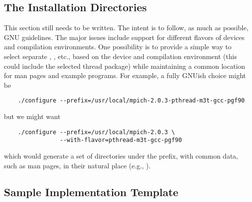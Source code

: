 \documentclass{article}
\begin{document}
\subsection{The Installation Directories}
\label{sec:install-dirs}
This section still needs to be written.  The intent is to follow, as
much as possible, GNU guidelines.  The major issues include support
for different flavors of devices and compilation environments.  One
possibility is to provide a simple way to select separate
, , etc., based on the device and
compilation environment (this could include the selected thread
package) while maintaining a common location for man pages and example
programs.  For example, a fully GNUish choice might be
\begin{verbatim}
    ./configure --prefix=/usr/local/mpich-2.0.3-pthread-m3t-gcc-pgf90
\end{verbatim}
but we might want
\begin{verbatim}
    ./configure --prefix=/usr/local/mpich-2.0.3 \
                --with-flavor=pthread-m3t-gcc-pgf90
\end{verbatim}
which would generate a set of directories under the
 prefix, with common data, such as man
pages, in their natural place (e.g.,
).

\subsection{Sample Implementation Template}
\label{sec:template}
\end{document}
